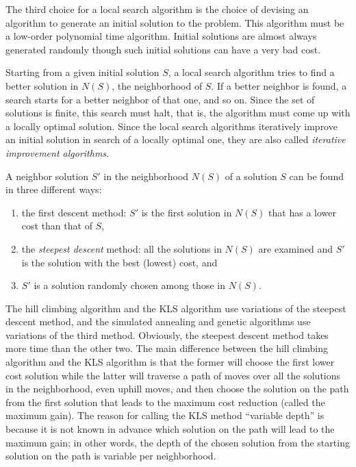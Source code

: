 \documentclass{article}
\begin{document}
The third choice for a local search algorithm is the choice of
devising an algorithm to generate an initial solution to the
problem. This algorithm must be a low-order polynomial time algorithm.
Initial solutions are almost always generated randomly though such
initial solutions can have a very bad cost.

Starting from a given initial solution $S$, a local search algorithm
tries to find a better solution in $N(S)$, the neighborhood of $S$. If
a better neighbor is found, a search starts for a better neighbor of
that one, and so on. Since the set of solutions is finite, this search
must halt, that is, the algorithm must come up with a locally optimal
solution. Since the local search algorithms iteratively improve an
initial solution in search of a locally optimal one, they are also
called {\em iterative improvement algorithms}.

A neighbor solution $S'$ in the neighborhood $N(S)$ of a solution $S$
can be found in three different ways:
\begin{enumerate}
\item the first descent method: $S'$ is the first solution in $N(S)$ that has
a lower cost than that of $S$,

\item the {\em steepest descent} method: all the solutions in $N(S)$
  are examined and $S'$ is the solution with the best (lowest) cost,
  and

\item $S'$ is a solution randomly chosen among those in $N(S)$.
\end{enumerate}

The hill climbing algorithm and the KLS algorithm use variations of
the steepest descent method, and the simulated annealing and genetic
algorithms use variations of the third method. Obviously, the steepest
descent method takes more time than the other two. The main difference
between the hill climbing algorithm and the KLS algorithm is that the
former will choose the first lower cost solution while the latter will
traverse a path of moves over all the solutions in the neighborhood,
even uphill moves, and then choose the solution on the path from the
first solution that leads to the maximum cost reduction (called the
maximum gain). The reason for calling the KLS method ``variable
depth'' is because it is not known in advance which solution on the
path will lead to the maximum gain; in other words, the depth of the
chosen solution from the starting solution on the path is variable per
neighborhood.
\end{document}
